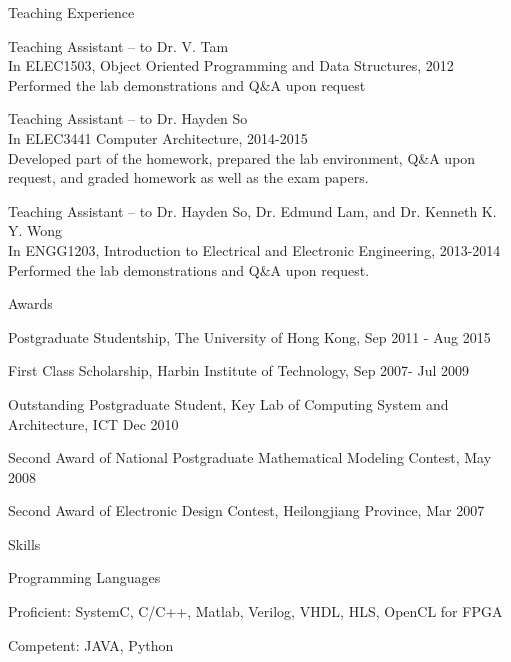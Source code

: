 \documentclass{resume} %
\begin{document}
\begin{rSection}{Teaching Experience}
    \vspace{-1em}
\item Teaching Assistant – to Dr. V. Tam \\In ELEC1503, Object Oriented Programming 
and Data Structures, 2012 \\Performed the lab demonstrations and Q\&A upon request

\item Teaching Assistant – to Dr. Hayden So \\In ELEC3441 Computer Architecture, 2014-2015
\\Developed part of the homework, prepared the lab environment, Q\&A upon request, and graded homework as well as the exam papers.

\item Teaching Assistant – to Dr. Hayden So, Dr. Edmund Lam, and Dr. Kenneth K. Y. Wong 
\\In ENGG1203, Introduction to Electrical and Electronic Engineering, 2013-2014
\\Performed the lab demonstrations and Q\&A upon request. 

\end{rSection}

\begin{rSection}{Awards}
    \vspace{-1em}
\item Postgraduate Studentship, The University of Hong Kong, Sep 2011 - Aug 2015 
    \vspace{-0.5em}
\item First Class Scholarship, Harbin Institute of Technology, Sep 2007- Jul 2009
    \vspace{-0.5em}
\item Outstanding Postgraduate Student, Key Lab of Computing System and Architecture, ICT Dec 2010
    \vspace{-0.5em}
\item Second Award of National Postgraduate Mathematical Modeling Contest, May 2008
    \vspace{-0.5em}
\item Second Award of Electronic Design Contest, Heilongjiang Province, Mar 2007
    \vspace{-0.5em}
\end{rSection}

\begin{rSection}{Skills}
    \begin{rSubsection}{Programming Languages}{}{}{}
    \item Proficient: SystemC, C/C++, Matlab, Verilog, VHDL, HLS, OpenCL for FPGA
    \item Competent: JAVA, Python
    \end{rSubsection}
\end{rSection}
\end{document}
